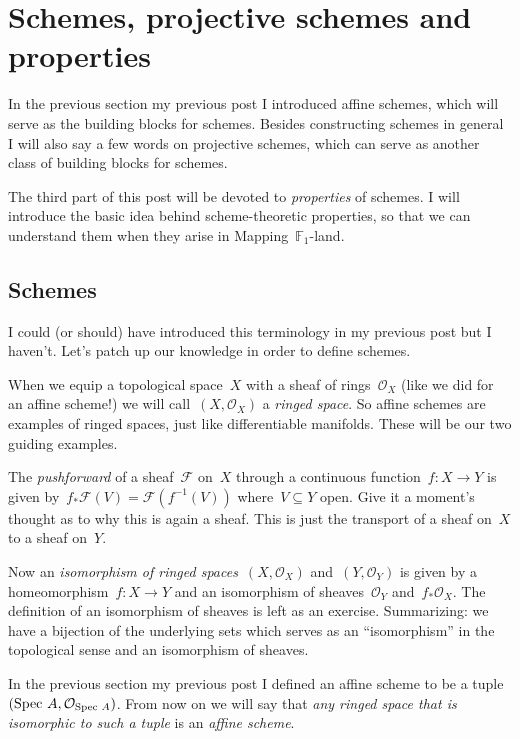 \section{Schemes, projective schemes and properties}

In \iftex the previous section \fi\ifblog my previous post \fi I introduced affine schemes, which will serve as the building blocks for schemes. Besides constructing schemes in general I will also say a few words on projective schemes, which can serve as another class of building blocks for schemes.

The third part of this post will be devoted to \emph{properties} of schemes. I will introduce the basic idea behind scheme-theoretic properties, so that we can understand them when they arise in \iftex\cite{mapping-fun}\fi\ifblog Mapping~$\mathbb{F}_1$-land\fi.

\subsection{Schemes}
I could (or should) have introduced this terminology in my previous post but I haven't. Let's patch up our knowledge in order to define schemes.

\begin{definition}
  When we equip a topological space~$X$ with a sheaf of rings~$\mathcal{O}_X$ (like we did for an affine scheme!) we will call~$(X,\mathcal{O}_X)$ a \emph{ringed space}. So affine schemes are examples of ringed spaces, just like differentiable manifolds. These will be our two guiding examples.
\end{definition}

\begin{definition}
  The \emph{pushforward} of a sheaf~$\mathcal{F}$ on~$X$ through a continuous function~$f\colon X\to Y$ is given by~$f_\ast\mathcal{F}(V)=\mathcal{F}(f^{-1}(V))$ where~$V\subseteq Y$ open. Give it a moment's thought as to why this is again a sheaf. This is just the transport of a sheaf on~$X$ to a sheaf on~$Y$.
\end{definition}

\begin{definition}
  Now an \emph{isomorphism of ringed spaces}~$(X,\mathcal{O}_X)$ and~$(Y,\mathcal{O}_Y)$ is given by a homeomorphism~$f\colon X\to Y$ and an isomorphism of sheaves~$\mathcal{O}_Y$ and~$f_\ast\mathcal{O}_X$. The definition of an isomorphism of sheaves is left as an exercise. Summarizing: we have a bijection of the underlying sets which serves as an ``isomorphism'' in the topological sense and an isomorphism of sheaves.
  
  In \iftex the previous section \fi\ifblog my previous post \fi I defined an affine scheme to be a tuple~$(\operatorname{Spec\,} A,\mathcal{O}_{\operatorname{Spec\,} A})$. From now on we will say that \emph{any ringed space that is isomorphic to such a tuple} is an \emph{affine scheme}.
\end{definition}

